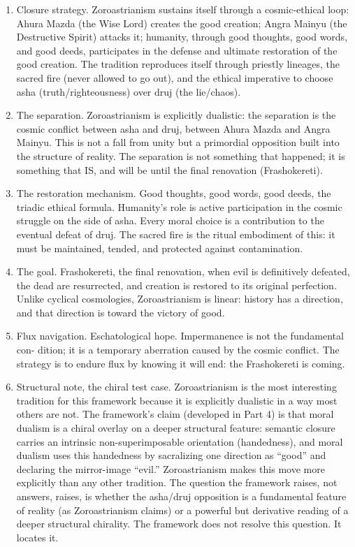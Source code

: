 \documentclass[
]{article}
\providecommand{\tightlist}{%
  \setlength{\itemsep}{0pt}\setlength{\parskip}{0pt}}
\begin{document}
\begin{enumerate}
\def\labelenumi{\arabic{enumi}.}
\setcounter{enumi}{70}
\tightlist
\item
  Closure strategy. Zoroastrianism sustains itself through a
  cosmic-ethical loop: Ahura Mazda (the Wise Lord) creates the good
  creation; Angra Mainyu (the Destructive Spirit) attacks it; humanity,
  through good thoughts, good words, and good deeds, participates in the
  defense and ultimate restoration of the good creation. The tradition
  reproduces itself through priestly lineages, the sacred fire (never
  allowed to go out), and the ethical imperative to choose asha
  (truth/righteousness) over druj (the lie/chaos).
\item
  The separation. Zoroastrianism is explicitly dualistic: the separation
  is the cosmic conflict between asha and druj, between Ahura Mazda and
  Angra Mainyu. This is not a fall from unity but a primordial
  opposition built into the structure of reality. The separation is not
  something that happened; it is something that IS, and will be until
  the final renovation (Frashokereti).
\item
  The restoration mechanism. Good thoughts, good words, good deeds, the
  triadic ethical formula. Humanity's role is active participation in
  the cosmic struggle on the side of asha. Every moral choice is a
  contribution to the eventual defeat of druj. The sacred fire is the
  ritual embodiment of this: it must be maintained, tended, and
  protected against contamination.
\item
  The goal. Frashokereti, the final renovation, when evil is
  definitively defeated, the dead are resurrected, and creation is
  restored to its original perfection. Unlike cyclical cosmologies,
  Zoroastrianism is linear: history has a direction, and that direction
  is toward the victory of good.
\item
  Flux navigation. Eschatological hope. Impermanence is not the
  fundamental con- dition; it is a temporary aberration caused by the
  cosmic conflict. The strategy is to endure flux by knowing it will
  end: the Frashokereti is coming.
\item
  Structural note, the chiral test case. Zoroastrianism is the most
  interesting tradition for this framework because it is explicitly
  dualistic in a way most others are not. The framework's claim
  (developed in Part 4) is that moral dualism is a chiral overlay on a
  deeper structural feature: semantic closure carries an intrinsic
  non-superimposable orientation (handedness), and moral dualism uses
  this handedness by sacralizing one direction as ``good'' and declaring
  the mirror-image ``evil.'' Zoroastrianism makes this move more
  explicitly than any other tradition. The question the framework
  raises, not answers, raises, is whether the asha/druj opposition is a
  fundamental feature of reality (as Zoroastrianism claims) or a
  powerful but derivative reading of a deeper structural chirality. The
  framework does not resolve this question. It locates it.
\end{enumerate}
\end{document}
